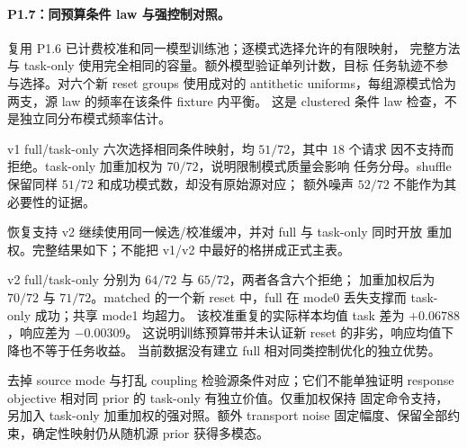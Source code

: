 \paragraph{P1.7：同预算条件 law 与强控制对照。}
复用 P1.6 已计费校准和同一模型训练池；逐模式选择允许的有限映射，
完整方法与 task-only 使用完全相同的容量。额外模型验证单列计数，目标
任务轨迹不参与选择。对六个新 reset groups 使用成对的 antithetic
uniforms，每组源模式恰为两支，源 law 的频率在该条件 fixture 内平衡。
这是 clustered 条件 law 检查，不是独立同分布模式频率估计。


v1 full/task-only 六次选择相同条件映射，均 $51/72$，其中 $18$ 个请求
因不支持而拒绝。task-only 加重加权为 $70/72$，说明限制模式质量会影响
任务分母。shuffle 保留同样 $51/72$ 和成功模式数，却没有原始源对应；
额外噪声 $52/72$ 不能作为其必要性的证据。

恢复支持 v2 继续使用同一候选/校准缓冲，并对 full 与 task-only 同时开放
重加权。完整结果如下；不能把 v1/v2 中最好的格拼成正式主表。

v2 full/task-only 分别为 $64/72$ 与 $65/72$，两者各含六个拒绝；
加重加权后为 $70/72$ 与 $71/72$。matched 的一个新 reset 中，full
在 mode0 丢失支撑而 task-only 成功；共享 mode1 均超力。
该校准重复的实际样本均值 task 差为 $+0.06788$，响应差为 $-0.00309$。
这说明训练预算带并未认证新 reset 的非劣，响应均值下降也不等于任务收益。
当前数据没有建立 full 相对同类控制优化的独立优势。

去掉 source mode 与打乱 coupling 检验源条件对应；它们不能单独证明
response objective 相对同 prior 的 task-only 有独立价值。仅重加权保持
固定命令支持，另加入 task-only 加重加权的强对照。额外 transport noise
固定幅度、保留全部约束，确定性映射仍从随机源 prior 获得多模态。
